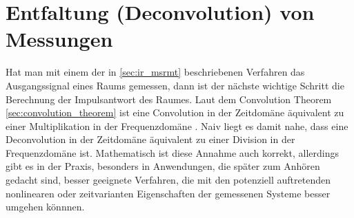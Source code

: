 \section{Entfaltung (Deconvolution) von Messungen}
\label{sec:deconvolution}
Hat man mit einem der in \ref{sec:ir_msrmt} beschriebenen Verfahren das Ausgangssignal eines Raums gemessen, dann ist der nächste wichtige Schritt die Berechnung der
Impulsantwort des Raumes. Laut dem Convolution Theorem \ref{sec:convolution_theorem} ist eine Convolution in der Zeitdomäne äquivalent zu einer Multiplikation in der Frequenzdomäne \cite[Kap. 2]{oppenheim1999}.
Naiv liegt es damit nahe, dass eine Deconvolution in der Zeitdomäne äquivalent zu einer Division in der Frequenzdomäne ist. Mathematisch ist diese Annahme auch korrekt,
allerdings gibt es in der Praxis, besonders in Anwendungen, die später zum Anhören gedacht sind, besser geeignete Verfahren, die mit den potenziell auftretenden nonlinearen
oder zeitvarianten Eigenschaften der gemessenen Systeme besser umgehen könnnen. 